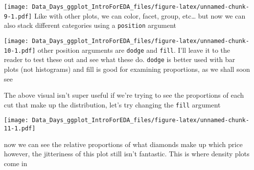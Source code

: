\documentclass[
]{article}
\newenvironment{Shaded}{\begin{snugshade}}{\end{snugshade}}
\newcommand{\DataTypeTok}[1]{\textcolor[rgb]{0.13,0.29,0.53}{#1}}
\newcommand{\DecValTok}[1]{\textcolor[rgb]{0.00,0.00,0.81}{#1}}
\newcommand{\FloatTok}[1]{\textcolor[rgb]{0.00,0.00,0.81}{#1}}
\newcommand{\KeywordTok}[1]{\textcolor[rgb]{0.13,0.29,0.53}{\textbf{#1}}}
\newcommand{\NormalTok}[1]{#1}
\newcommand{\OperatorTok}[1]{\textcolor[rgb]{0.81,0.36,0.00}{\textbf{#1}}}
\newcommand{\StringTok}[1]{\textcolor[rgb]{0.31,0.60,0.02}{#1}}
\begin{document}
\texttt{[image: Data\_Days\_ggplot\_IntroForEDA\_files/figure-latex/unnamed-chunk-9-1.pdf]}
Like with other plots, we can color, facet, group, etc\ldots{} but now
we can also stack different categories using a \texttt{position}
argument

\begin{Shaded}
\end{Shaded}

\texttt{[image: Data\_Days\_ggplot\_IntroForEDA\_files/figure-latex/unnamed-chunk-10-1.pdf]}
other position arguments are \texttt{dodge} and \texttt{fill}. I'll
leave it to the reader to test these out and see what these do.
\texttt{dodge} is better used with bar plots (not histograms) and fill
is good for examining proportions, as we shall soon see

The above visual isn't super useful if we're trying to see the
proportions of each cut that make up the distribution, let's try
changing the \texttt{fill} argument

\begin{Shaded}
\end{Shaded}

\texttt{[image: Data\_Days\_ggplot\_IntroForEDA\_files/figure-latex/unnamed-chunk-11-1.pdf]}

now we can see the relative proportions of what diamonds make up which
price however, the jitteriness of this plot still isn't fantastic. This
is where density plots come in

\begin{Shaded}
\end{Shaded}
\end{document}
